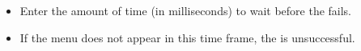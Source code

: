 
\begin{itemize}
\item Enter the amount of time (in milliseconds) to  wait before the \gdstep{} fails.
\item If the menu does not appear in this time frame, the \gdstep{} is unsuccessful.
\end{itemize}

